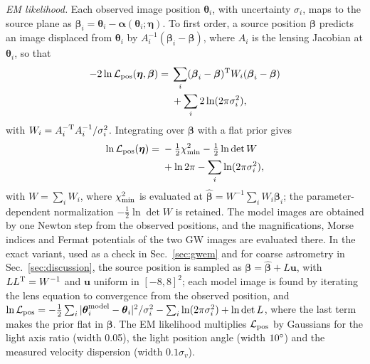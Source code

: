 \emph{EM likelihood.} Each observed image position $\boldsymbol\theta_i$, with uncertainty $\sigma_i$, maps to the source plane as $\boldsymbol\beta_i=\boldsymbol\theta_i-\boldsymbol\alpha(\boldsymbol\theta_i;\boldsymbol\eta)$. To first order, a source position $\boldsymbol\beta$ predicts an image displaced from $\boldsymbol\theta_i$ by $A_i^{-1}(\boldsymbol\beta_i-\boldsymbol\beta)$, where $A_i$ is the lensing Jacobian at $\boldsymbol\theta_i$, so that
\begin{equation}
\begin{split}
-2\ln\mathcal L_{\rm pos}(\boldsymbol\eta,\boldsymbol\beta)={}&\sum_i(\boldsymbol\beta_i-\boldsymbol\beta)^{\rm T}W_i(\boldsymbol\beta_i-\boldsymbol\beta)\\
&+\sum_i 2\ln(2\pi\sigma_i^2),
\end{split}
\end{equation}
with $W_i=A_i^{-\rm T}A_i^{-1}/\sigma_i^2$.
Integrating over $\boldsymbol\beta$ with a flat prior gives
\begin{equation}
\begin{split}
\ln\mathcal L_{\rm pos}(\boldsymbol\eta)={}&-\tfrac12\chi^2_{\rm min}-\tfrac12\ln\det W\\
&+\ln2\pi-\sum_i\ln(2\pi\sigma_i^2),
\end{split}
\end{equation}
with $W=\sum_iW_i$,
where $\chi^2_{\rm min}$ is evaluated at $\hat{\boldsymbol\beta}=W^{-1}\sum_iW_i\boldsymbol\beta_i$; the parameter-dependent normalization $-\frac12\ln\det W$ is retained. The model images are obtained by one Newton step from the observed positions, and the magnifications, Morse indices and Fermat potentials of the two GW images are evaluated there. In the exact variant, used as a check in Sec.~\ref{sec:gwem} and for coarse astrometry in Sec.~\ref{sec:discussion}, the source position is sampled as $\boldsymbol\beta=\hat{\boldsymbol\beta}+L\boldsymbol u$, with $LL^{\rm T}=W^{-1}$ and $\boldsymbol u$ uniform in $[-8,8]^2$; each model image is found by iterating the lens equation to convergence from the observed position, and $\ln\mathcal L_{\rm pos}=-\frac12\sum_i|\boldsymbol\theta_i^{\rm model}-\boldsymbol\theta_i|^2/\sigma_i^2-\sum_i\ln(2\pi\sigma_i^2)+\ln\det L$, where the last term makes the prior flat in $\boldsymbol\beta$. The EM likelihood multiplies $\mathcal L_{\rm pos}$ by Gaussians for the light axis ratio (width 0.05), the light position angle (width $10^\circ$) and the measured velocity dispersion (width $0.1\sigma_v$).

